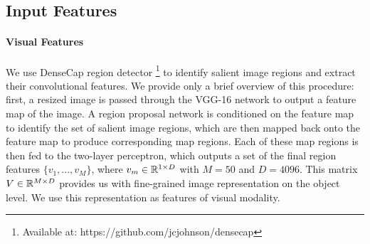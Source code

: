 \documentclass[11pt,a4paper]{article}
\newcommand{\R}{\mathbb{R}}
\begin{document}

\subsection{Input Features}

\paragraph{Visual Features}
We use DenseCap region detector \cite{densecap}\footnote{Available at: https://github.com/jcjohnson/densecap} to identify salient image regions and extract their convolutional features.
We provide only a brief overview of this procedure: first, a resized image is passed through the VGG-16 network \cite{Simonyan2014} to output a feature map of the image.
A region proposal network is conditioned on the feature map to identify the set of salient image regions, which are then mapped back onto the feature map to produce corresponding map regions.
Each of these map regions is then fed to the two-layer perceptron, which outputs a set of the final region features ${\{v_1, ..., v_M\}}$, where $v_m \in \R\sp{1 \times D}$ with $M=50$ and $D=4096$.
This matrix $V \in \R\sp{M \times D}$ provides us with fine-grained image representation on the object level.
We use this representation as features of visual modality.
\end{document}
